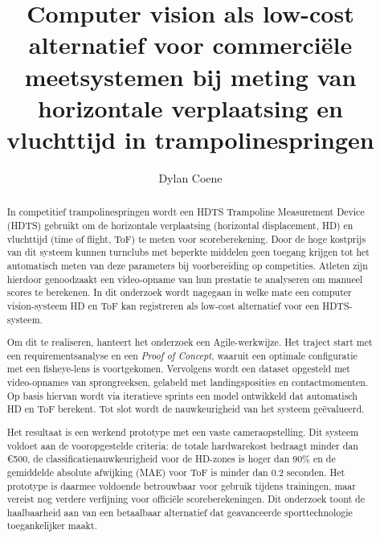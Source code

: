 \documentclass{hogent-article}
\title{Computer vision als low-cost alternatief voor commerci\"{e}le meetsystemen bij meting van horizontale verplaatsing en vluchttijd in trampolinespringen}
\author{Dylan Coene}
\begin{document}
\begin{abstract}
    In competitief trampolinespringen wordt een HDTS Trampoline Measurement Device (HDTS) gebruikt om de horizontale verplaatsing (horizontal displacement, HD) en vluchttijd (time of flight, ToF) te meten voor scoreberekening. Door de hoge kostprijs van dit systeem kunnen turnclubs met beperkte middelen geen toegang krijgen tot het automatisch meten van deze parameters bij voorbereiding op competities. Atleten zijn hierdoor genoodzaakt een video-opname van hun prestatie te analyseren om manueel scores te berekenen. In dit onderzoek wordt nagegaan in welke mate een computer vision-systeem HD en ToF kan registreren als low-cost alternatief voor een HDTS-systeem.
    
    Om dit te realiseren, hanteert het onderzoek een Agile-werkwijze. Het traject start met een requirementsanalyse en een \textit{Proof of Concept}, waaruit een optimale configuratie met een fisheye-lens is voortgekomen. Vervolgens wordt een dataset opgesteld met video-opnames van sprongreeksen, gelabeld met landingsposities en contactmomenten. Op basis hiervan wordt via iteratieve sprints een model ontwikkeld dat automatisch HD en ToF berekent. Tot slot wordt de nauwkeurigheid van het systeem ge\"{e}valueerd.
    
    Het resultaat is een werkend prototype met een vaste cameraopstelling. Dit systeem voldoet aan de vooropgestelde criteria: de totale hardwarekost bedraagt minder dan \euro{}500, de classificatienauwkeurigheid voor de HD-zones is hoger dan 90\% en de gemiddelde absolute afwijking (MAE) voor ToF is minder dan 0.2 seconden. Het prototype is daarmee voldoende betrouwbaar voor gebruik tijdens trainingen, maar vereist nog verdere verfijning voor offici{\"e}le scoreberekeningen. Dit onderzoek toont de haalbaarheid aan van een betaalbaar alternatief dat geavanceerde sporttechnologie toegankelijker maakt.
\end{abstract}

\tableofcontents



\printbibliography[heading=bibintoc]
\end{document}
